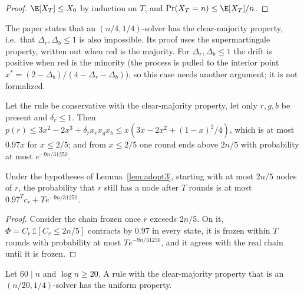 \begin{proof}
  \leanok
  $\E[X_T] \le X_0$ by induction on $T$, and $\Pr(X_T = n) \le \E[X_T]/n$.
\end{proof}

\begin{remark}
  The paper states that an $(n/4,1/4)$-solver has the clear-majority
  property, i.e.\ that $\Delta_r, \Delta_b \le 1$ is also impossible. Its
  proof uses the supermartingale property, written out when red is the
  majority. For $\Delta_r, \Delta_b \le 1$ the drift is positive when red is
  the minority (the process is pulled to the interior point
  $x^* = (2 - \Delta_b)/(4 - \Delta_r - \Delta_b)$), so this case needs
  another argument; it is not formalized.
\end{remark}

\begin{lemma}\label{lem:adopt3}
  \leanok
  Let the rule be conservative with the clear-majority property, let only
  $r, g, b$ be present and $\delta_r \le 1$. Then
  $p(r) \le 3x^2 - 2x^3 + \delta_r x_r x_g x_b \le x(3x - 2x^2 + (1-x)^2/4)$,
  which is at most $0.97x$ for $x \le 2/5$; and from $x \le 2/5$ one round
  ends above $2n/5$ with probability at most $e^{-9n/31250}$.
\end{lemma}

\begin{lemma}\label{lem:extinct}
  \leanok
  Under the hypotheses of Lemma~\ref{lem:adopt3}, starting with at most $2n/5$
  nodes of $r$, the probability that $r$ still has a node after $T$ rounds is
  at most $0.97^T c_r + T e^{-9n/31250}$.
\end{lemma}

\begin{proof}
  \leanok
  Consider the chain frozen once $r$ exceeds $2n/5$. On it,
  $\Phi = C_r\,\mathbb 1[C_r \le 2n/5]$ contracts by $0.97$ in every state,
  it is frozen within $T$ rounds with probability at most $Te^{-9n/31250}$,
  and it agrees with the real chain until it is frozen.
\end{proof}

\begin{theorem}\label{thm:4_8_b}
  \leanok
  Let $60 \mid n$ and $\log n \ge 20$. A rule with the clear-majority property
  that is an $(n/20, 1/4)$-solver has the uniform property.
\end{theorem}

